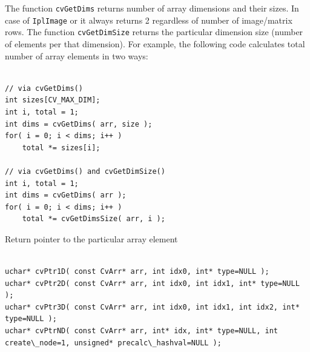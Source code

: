 The function \texttt{cvGetDims} returns number of array dimensions and
their sizes. In case of \texttt{IplImage} or  it always
returns 2 regardless of number of image/matrix rows. The function
\texttt{cvGetDimSize} returns the particular dimension size (number of
elements per that dimension). For example, the following code calculates
total number of array elements in two ways:

\begin{lstlisting}

// via cvGetDims()
int sizes[CV_MAX_DIM];
int i, total = 1;
int dims = cvGetDims( arr, size );
for( i = 0; i < dims; i++ )
    total *= sizes[i];

// via cvGetDims() and cvGetDimSize()
int i, total = 1;
int dims = cvGetDims( arr );
for( i = 0; i < dims; i++ )
    total *= cvGetDimsSize( arr, i );

\end{lstlisting}


\label{PtrnD}

Return pointer to the particular array element

\begin{lstlisting}

uchar* cvPtr1D( const CvArr* arr, int idx0, int* type=NULL );
uchar* cvPtr2D( const CvArr* arr, int idx0, int idx1, int* type=NULL );
uchar* cvPtr3D( const CvArr* arr, int idx0, int idx1, int idx2, int* type=NULL );
uchar* cvPtrND( const CvArr* arr, int* idx, int* type=NULL, int create\_node=1, unsigned* precalc\_hashval=NULL );

\end{lstlisting}

\begin{description}
\end{description}

